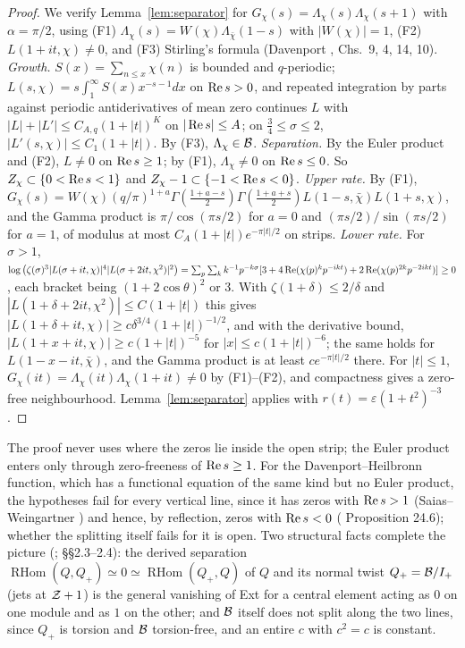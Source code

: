 \begin{proof}
We verify Lemma~\ref{lem:separator} for $G_\chi(s)=\Lambda_\chi(s)\Lambda_\chi(s+1)$ with $\alpha=\pi/2$, using (F1) $\Lambda_\chi(s)=W(\chi)\Lambda_{\bar\chi}(1-s)$ with $|W(\chi)|=1$, (F2) $L(1+it,\chi)\ne0$, and (F3) Stirling's formula (Davenport \cite{Davenport}, Chs.~9, 4, 14, 10).
\emph{Growth.} $S(x)=\sum_{n\le x}\chi(n)$ is bounded and $q$-periodic; $L(s,\chi)=s\int_1^\infty S(x)x^{-s-1}dx$ on $\operatorname{Re} s>0$, and repeated integration by parts against periodic antiderivatives of mean zero continues $L$ with $|L|+|L'|\le C_{A,q}(1+|t|)^K$ on $|\operatorname{Re} s|\le A$; on $\tfrac34\le\sigma\le2$, $|L'(s,\chi)|\le C_1(1+|t|)$. By (F3), $\Lambda_\chi\in\mathcal{B}$.
\emph{Separation.} By the Euler product and (F2), $L\ne0$ on $\operatorname{Re} s\ge1$; by (F1), $\Lambda_\chi\ne0$ on $\operatorname{Re} s\le0$. So $Z_\chi\subset\{0<\operatorname{Re} s<1\}$ and $Z_\chi-1\subset\{-1<\operatorname{Re} s<0\}$.
\emph{Upper rate.} By (F1), $G_\chi(s)=W(\chi)(q/\pi)^{1+a}\Gamma(\tfrac{1+a-s}2)\Gamma(\tfrac{1+a+s}2)L(1-s,\bar\chi)L(1+s,\chi)$, and the Gamma product is $\pi/\cos(\pi s/2)$ for $a=0$ and $(\pi s/2)/\sin(\pi s/2)$ for $a=1$, of modulus at most $C_A(1+|t|)e^{-\pi|t|/2}$ on strips.
\emph{Lower rate.} For $\sigma>1$, $\log\big(\zeta(\sigma)^3|L(\sigma+it,\chi)|^4|L(\sigma+2it,\chi^2)|^2\big)=\sum_p\sum_kk^{-1}p^{-k\sigma}[3+4\operatorname{Re}(\chi(p)^kp^{-ikt})+2\operatorname{Re}(\chi(p)^{2k}p^{-2ikt})]\ge0$, each bracket being $(1+2\cos\theta)^2$ or $3$. With $\zeta(1+\delta)\le2/\delta$ and $|L(1+\delta+2it,\chi^2)|\le C(1+|t|)$ this gives $|L(1+\delta+it,\chi)|\ge c\delta^{3/4}(1+|t|)^{-1/2}$, and with the derivative bound, $|L(1+x+it,\chi)|\ge c(1+|t|)^{-5}$ for $|x|\le c(1+|t|)^{-6}$; the same holds for $L(1-x-it,\bar\chi)$, and the Gamma product is at least $ce^{-\pi|t|/2}$ there. For $|t|\le1$, $G_\chi(it)=\Lambda_\chi(it)\Lambda_\chi(1+it)\ne0$ by (F1)--(F2), and compactness gives a zero-free neighbourhood. Lemma~\ref{lem:separator} applies with $r(t)=\varepsilon(1+t^2)^{-3}$.
\end{proof}

The proof never uses where the zeros lie inside the open strip; the Euler product enters only through zero-freeness of $\operatorname{Re} s\ge1$. For the Davenport--Heilbronn function, which has a functional equation of the same kind but no Euler product, the hypotheses fail for every vertical line, since it has zeros with $\operatorname{Re} s>1$ (Saias--Weingartner \cite{SaiasWeingartner}) and hence, by reflection, zeros with $\operatorname{Re} s<0$ ( Proposition 24.6); whether the splitting itself fails for it is open.
Two structural facts complete the picture (;  §§2.3--2.4): the derived separation $\operatorname{RHom}(Q,Q_+)\simeq0\simeq\operatorname{RHom}(Q_+,Q)$ of $Q$ and its normal twist $Q_+=\mathcal{B}/I_+$ (jets at $\mathcal{Z}+1$) is the general vanishing of Ext for a central element acting as $0$ on one module and as $1$ on the other; and $\mathcal{B}$ itself does not split along the two lines, since $Q_+$ is torsion and $\mathcal{B}$ torsion-free, and an entire $c$ with $c^2=c$ is constant.

